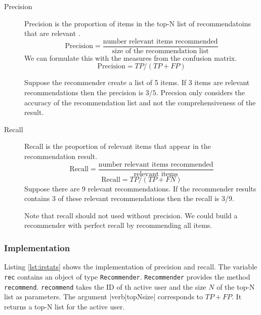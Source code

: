 \begin{description}
\item[Precision] Precision is the proportion of items in the top-N list of recommendatoins that are relevant \cite{Manning}.
  \begin{equation}
    \label{eq:precision}
    \text{Precision} = \frac{\text{number relevant items recommended}}{\text{size of the recommendation list}}
  \end{equation}
We can formulate this with the measures from the confusion matrix.
  \begin{equation}
    \label{eq:precisionm}
    \text{Precision} = TP/(TP+FP)
  \end{equation}

 Suppose the recommender create a list of 5 items. If 3 items are relevant recommendations then the precision is $3/5$. 
Precsion only considers the accuracy of the recommendation list and not the comprehensiveness of the result.

\item[Recall] Recall is the proportion of relevant items that appear in the recommendation result. 
  \begin{equation}
    \label{eq:recall}
    \text{Recall} = \frac{\text{number relevant items recommended}}{\text{relevant items}}
  \end{equation}
  \begin{equation}
    \label{eq:recallcm}
    \text{Recall} = TP/(TP+FN)
  \end{equation}
Suppose there are 9 relevant recommendations. If the recommender results contains 3 of these relevant recommendations then the recall is 3/9.

Note that recall should not used without precision. We could build a recommender with perfect recall by recommending all items.
\end{description}

\subsubsection{Implementation}
\label{sec:irimpl}

Listing \ref{lst:irstats} shows the implementation of precision and recall. 
The variable \verb|rec| contains an object of type \verb|Recommender|. \verb|Recommender| provides the method \verb|recommend|. \verb|recommend| takes the ID of th active user and the size $N$ of the top-N list as parameters. The argument |verb|topNsize| corresponds to $TP+FP$. It returns a top-N list for the active user. 

